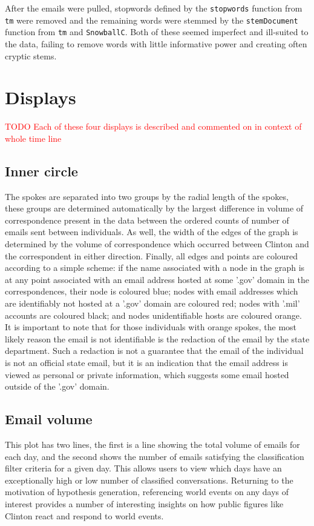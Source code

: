 \documentclass[journal]{vgtc}                %
\newcommand*{\TODO}[1]{\textcolor{red}{TODO #1}}
\begin{document}
After the emails were pulled, stopwords defined by the \texttt{stopwords} function from \texttt{tm} were removed and the remaining words were stemmed by the \texttt{stemDocument} function from \texttt{tm} and \texttt{SnowballC}. Both of these seemed imperfect and ill-suited to the data, failing to remove words with little informative power and creating often cryptic stems.

\section{Displays}
\TODO{Each of these four displays is described and commented on in context of whole time line}
\subsection{Inner circle} 
The spokes are separated into two groups by the radial length of the spokes, these groups are determined automatically by the largest difference in volume of correspondence present in the data between the ordered counts of number of emails sent between individuals. As well, the width of the edges of the graph is determined by the volume of correspondence which occurred between Clinton and the correspondent in either direction. Finally, all edges and points are coloured according to a simple scheme: if the name associated with a node in the graph is at any point associated with an email address hosted at some '.gov' domain in the correspondences, their node is coloured blue; nodes with email addresses which are identifiably not hosted at a '.gov' domain are coloured red; nodes with '.mil' accounts are coloured black; and nodes unidentifiable hosts are coloured orange. It is important to note that for those individuals with orange spokes, the most likely reason the email is not identifiable is the redaction of the email by the state department. Such a redaction is not a guarantee that the email of the individual is not an official state email, but it is an indication that the email address is viewed as personal or private information, which suggests some email hosted outside of the '.gov' domain.

\subsection{Email volume}
This plot has two lines, the first is a line showing the total volume of emails for each day, and the second shows the number of emails satisfying the classification filter criteria for a given day. This allows users to view which days have an exceptionally high or low number of classified conversations. Returning to the motivation of hypothesis generation, referencing world events on any days of interest provides a number of interesting insights on how public figures like Clinton react and respond to world events.
\end{document}
